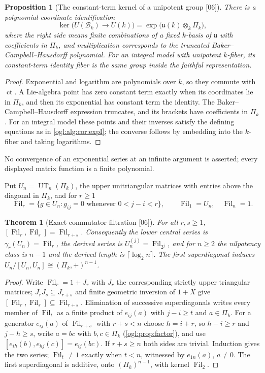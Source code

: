 \documentclass[11pt,oneside]{article}
\numberwithin{equation}{section}
\newtheorem{theorem}{Theorem}[section]
\newtheorem{proposition}[proposition]{Proposition}
\theoremstyle{definition}
\theoremstyle{remark}
\newcommand{\Bk}{\mathcal B_k}
\newcommand{\ct}{\operatorname{ct}}
\newcommand{\UT}{\operatorname{UT}}
\newcommand{\Fil}{\operatorname{Fil}}
\newcommand{\src}[1]{\textup{\textsf{\small[#1]}}}
\begin{document}
\begin{proposition}[The constant-term kernel of a unipotent group \src{06}]\label{ogl:alg:prop:bch}
There is a polynomial-coordinate identification
\[
 \ker\bigl(U(\Bk)\to U(k)\bigr)=\exp\bigl(\mathfrak u(k)\otimes_k\Pi_k\bigr),
\]
where the right side means finite combinations of a fixed $k$-basis of
$\mathfrak u$ with coefficients in $\Pi_k$, and multiplication corresponds to
the truncated Baker--Campbell--Hausdorff polynomial. For an integral model with
unipotent $k$-fiber, its constant-term identity fiber is the same group inside
the faithful representation.
\end{proposition}
\begin{proof}
Exponential and logarithm are polynomials over $k$, so they commute with
$\ct$. A Lie-algebra point has zero constant term exactly when its coordinates
lie in $\Pi_k$, and then its exponential has constant term the identity. The
Baker--Campbell--Hausdorff expression truncates, and its brackets have
coefficients in $\Pi_k$. For an integral model these points and their inverses
satisfy the defining equations as in \cref{ogl:alg:cor:expI}; the converse
follows by embedding into the $k$-fiber and taking logarithms.
\end{proof}

No convergence of an exponential series at an infinite argument is asserted;
every displayed matrix function is a finite polynomial.

Put $U_n=\UT_n(\Pi_k)$, the upper unitriangular matrices with entries above the
diagonal in $\Pi_k$, and for $r\ge1$
\[
 \Fil_r=\{g\in U_n:g_{ij}=0\text{ whenever }0<j-i<r\},
 \qquad \Fil_1=U_n,\quad \Fil_n=1.
\]

\begin{theorem}[Exact commutator filtration \src{06}]\label{ogl:alg:thm:ut}
For all $r,s\ge1$, $[\Fil_r,\Fil_s]=\Fil_{r+s}$. Consequently the lower central
series is $\gamma_r(U_n)=\Fil_r$, the derived series is $U_n^{(j)}=\Fil_{2^j}$,
and for $n\ge2$ the nilpotency class is $n-1$ and the derived length is
$\lceil\log_2n\rceil$. The first superdiagonal induces
$U_n/[U_n,U_n]\cong(\Pi_k,+)^{n-1}$.
\end{theorem}
\begin{proof}
Write $\Fil_r=1+J_r$ with $J_r$ the corresponding strictly upper triangular
matrices; $J_rJ_s\subseteq J_{r+s}$ and finite geometric inversion of $1+X$
give $[\Fil_r,\Fil_s]\subseteq\Fil_{r+s}$. Elimination of successive
superdiagonals writes every member of $\Fil_t$ as a finite product of
$e_{ij}(a)$ with $j-i\ge t$ and $a\in\Pi_k$. For a generator $e_{ij}(a)$ of
$\Fil_{r+s}$ with $r+s<n$ choose $h=i+r$, so $h-i\ge r$ and $j-h\ge s$, write
$a=bc$ with $b,c\in\Pi_k$ (\cref{ogl:prop:factor}), and use
$[e_{ih}(b),e_{hj}(c)]=e_{ij}(bc)$. If $r+s\ge n$ both sides are trivial.
Induction gives the two series; $\Fil_t\ne1$ exactly when $t<n$, witnessed by
$e_{1n}(a)$, $a\ne0$. The first superdiagonal is additive, onto
$(\Pi_k)^{n-1}$, with kernel $\Fil_2$.
\end{proof}
\end{document}

